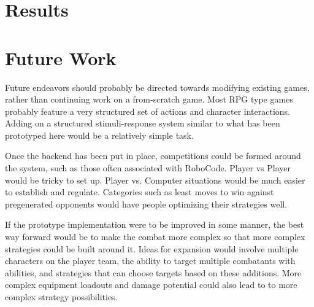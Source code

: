 \documentclass[11pt]{article}
\begin{document}

\section{Results} 

\section{Future Work}

Future endeavors should probably be directed towards modifying existing games, rather than continuing work on a from-scratch game.  Most RPG type games probably feature a very structured set of actions and character interactions.  Adding on a structured stimuli-response system similar to what has been prototyped here would be a relatively simple task.

Once the backend has been put in place, competitions could be formed around the system, such as those often associated with RoboCode.  Player vs Player would be tricky to set up.  Player vs. Computer situations would be much easier to establish and regulate.  Categories such as least moves to win against pregenerated opponents would have people optimizing their strategies well. 

If the prototype implementation were to be improved in some manner, the best way forward would be to make the combat more complex so that more complex strategies could be built around it.  Ideas for expansion would involve multiple characters on the player team, the ability to target multiple combatants with abilities, and strategies that can choose targets based on these additions. More complex equipment loadouts and damage potential could also lead to to more complex strategy possibilities.

\end{document}
